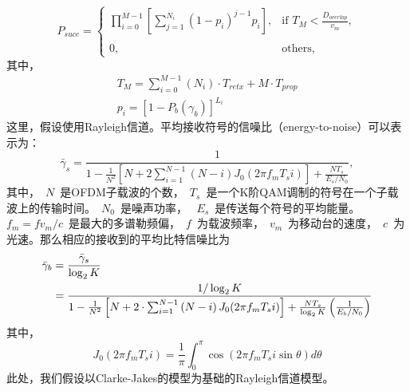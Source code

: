 \begin{equation}
P_{succ}=\left\{
\begin{array}{ll}
\prod_{i=0}^{M-1}\left[\sum_{j=1}^{N_{i}}(1-p_{i})^{j-1}p_{i}\right],
& \mbox{if }T_{M}<\frac{D_{overlap}}{v_{m}},\\
\\0, & \mbox{others},
\end{array}\right.\label{eq:chap_iccs_handover_algorithm_Pro_basic_final00}
\end{equation}
其中，
\begin{align*}
T_{M}=\sum_{i=0}^{M-1}(N_{i})\cdot T_{retx}+M\cdot T_{prop} \\
p_{i}=[1-P_{b}(\gamma_{b})]^{L_{i}}
\end{align*}
这里，假设使用Rayleigh信道。平均接收符号的信噪比（energy-to-noise）可以表示为：\cite{GLST:PMC2002}\cite{Leung:WCNC2005}
\begin{equation}
\bar{\gamma}_{s}=\frac{1}{1-\frac{1}{N^{2}}\left[N+2\sum_{i=1}^{N-1}\left(N-i\right)J_{0}(2\pi f_{m}T_{s}i) \right]
+\frac{NT_{s}}{E_s/N_{0}}},
\end{equation}
其中，~$N$~是OFDM子载波的个数，~$T_s$~是一个K阶QAM调制的符号在一个子载波上的传输时间。~$N_0$~是噪声功率， ~$E_s$~是传送每个符号的平均能量。~$f_{m}=fv_{m}/c $~是最大的多谱勒频偏，~$f$~为载波频率，~$v_m$~为移动台的速度，~$c$~为光速。那么相应的接收到的平均比特信噪比为
\begin{align}
\bar{\gamma}_{b}&= \frac{ \bar{\gamma}_s} {\log_2K} \notag\\
&=\frac{1/\log_{2}K}{1-\frac{1}{N^{2}}\left[N+2\cdot \sum_{i=1}^{N-1}\left(N-i\right) J_{0}(2\pi f_{m}T_{s}i) \right]
+\frac{NT_{s}}{\log_{2}K}\left(\frac{1}{E_{b}/N_{0}}\right)}
\label{eqn:chap_handover:avg_snr}
\end{align}
其中，
\begin{equation*}
J_{0}(2\pi f_{m}T_{s}i) = \frac{1}{\pi}\int_0^\pi \cos(2\pi f_m T_{s}i \sin \theta) d \theta
\end{equation*}
此处，我们假设以Clarke-Jakes的模型为基础的Rayleigh信道模型。


